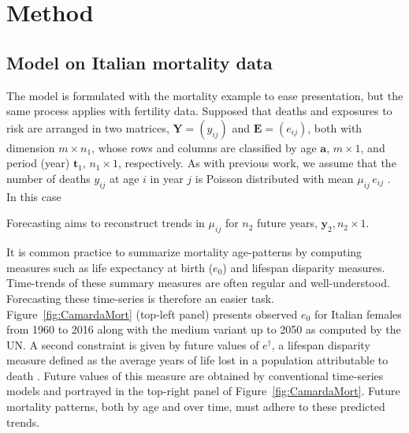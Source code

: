 \documentclass[12pt,a4paper,twoside]{article}
\begin{document}
\section{Method}

\subsection{Model on Italian mortality data}
The model is formulated with the mortality example to ease presentation, but the same process applies with fertility data. Supposed that deaths and exposures to risk are arranged in two matrices, 
$\bm{Y} = (y_{ij})$ and $\bm{E} = (e_{ij})$, both with dimension $m \times n_{1}$, whose rows and columns are classified by age $\bm{a}, \,m \times 1$, and period (year) $\bm{t}_{1}, \,n_{1} \times 1$, respectively.  As with previous work, we assume that the number of deaths $y_{ij}$ at age $i$ in year $j$ is Poisson distributed with mean $\mu_{ij} \,e_{ij}$ \citep{camarda2019smooth}. In this case 

Forecasting aims to reconstruct trends in $\mu_{ij}$ for $n_{2}$ future years, $\bm{y}_{2}, n_{2} \times 1$.

It is common practice to summarize mortality age-patterns by computing measures such as life expectancy at birth ($e_{0}$) and lifespan disparity measures. Time-trends of these summary measures are often regular and well-understood. Forecasting these time-series is therefore an easier task. Figure~\ref{fig:CamardaMort} (top-left panel) presents observed $e_{0}$ for Italian females from 1960 to 2016 along with the medium variant up to 2050 as computed by the UN. A second constraint is given by future values of $e^{\dagger}$, a lifespan disparity measure defined as the average years of life lost in a population attributable to death \citep{VaupelCRdemo2003}. Future values of this measure are obtained by conventional time-series models and portrayed in the top-right panel of Figure~\ref{fig:CamardaMort}. Future mortality patterns, both by age and over time, must adhere to these predicted trends.
\end{document}
